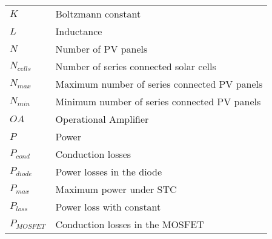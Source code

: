 \begin{tabular}{ll}
$K$ & Boltzmann constant \\
$L$ & Inductance\\
$N$ & Number of PV panels \\
$N_{cells}$ & Number of series connected solar cells \\ 
$N_{max}$ & Maximum number of series connected PV panels \\
$N_{min}$ & Minimum number of series connected PV panels \\
$OA$ & Operational Amplifier \\
$P$ & Power\\
$P_{cond}$ & Conduction losses \\
$P_{diode}$ & Power losses in the diode \\
$P_{max}$ & Maximum power under STC\\
$P_{loss}$ & Power loss with constant \\
$P_{MOSFET}$ & Conduction losses in the MOSFET \\
\end{tabular}
\newpage

